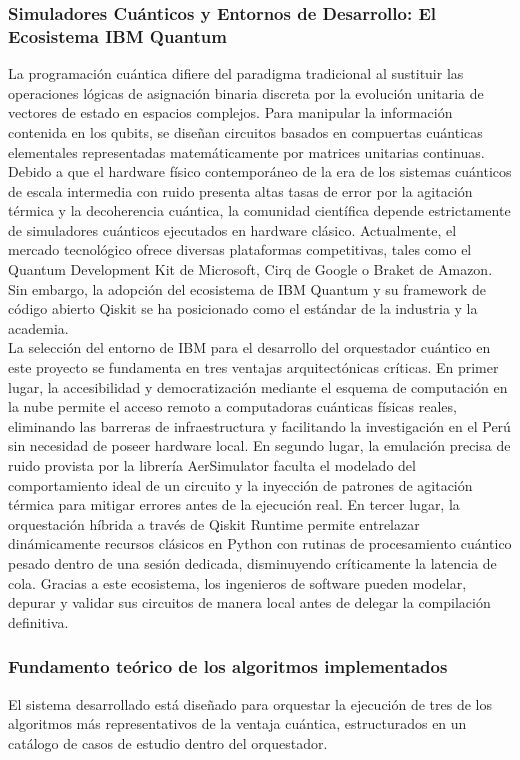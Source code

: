 \documentclass[12pt,a4paper]{article}
\begin{document}
\subsubsection{Simuladores Cuánticos y Entornos de Desarrollo: El Ecosistema IBM Quantum}
La programación cuántica difiere del paradigma tradicional al sustituir las operaciones lógicas de asignación binaria discreta por la evolución unitaria de vectores de estado en espacios complejos. Para manipular la información contenida en los qubits, se diseñan circuitos basados en compuertas cuánticas elementales representadas matemáticamente por matrices unitarias continuas. Debido a que el hardware físico contemporáneo de la era de los sistemas cuánticos de escala intermedia con ruido presenta altas tasas de error por la agitación térmica y la decoherencia cuántica, la comunidad científica depende estrictamente de simuladores cuánticos ejecutados en hardware clásico. Actualmente, el mercado tecnológico ofrece diversas plataformas competitivas, tales como el Quantum Development Kit de Microsoft, Cirq de Google o Braket de Amazon. Sin embargo, la adopción del ecosistema de IBM Quantum y su framework de código abierto Qiskit se ha posicionado como el estándar de la industria y la academia.\\

La selección del entorno de IBM para el desarrollo del orquestador cuántico en este proyecto se fundamenta en tres ventajas arquitectónicas críticas. En primer lugar, la accesibilidad y democratización mediante el esquema de computación en la nube permite el acceso remoto a computadoras cuánticas físicas reales, eliminando las barreras de infraestructura y facilitando la investigación en el Perú sin necesidad de poseer hardware local. En segundo lugar, la emulación precisa de ruido provista por la librería AerSimulator faculta el modelado del comportamiento ideal de un circuito y la inyección de patrones de agitación térmica para mitigar errores antes de la ejecución real. En tercer lugar, la orquestación híbrida a través de Qiskit Runtime permite entrelazar dinámicamente recursos clásicos en Python con rutinas de procesamiento cuántico pesado dentro de una sesión dedicada, disminuyendo críticamente la latencia de cola. Gracias a este ecosistema, los ingenieros de software pueden modelar, depurar y validar sus circuitos de manera local antes de delegar la compilación definitiva.

\subsubsection{Fundamento teórico de los algoritmos implementados}
El sistema desarrollado está diseñado para orquestar la ejecución de tres de los algoritmos más representativos de la ventaja cuántica, estructurados en un catálogo de casos de estudio dentro del orquestador. 
\end{document}
